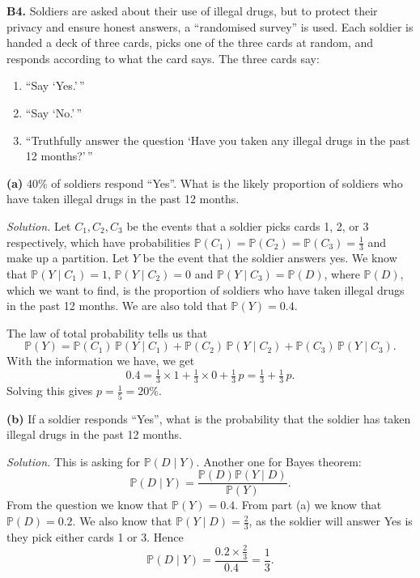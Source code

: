 \documentclass[
  a4paper,
]{book}
\providecommand{\tightlist}{%
  \setlength{\itemsep}{0pt}\setlength{\parskip}{0pt}}
\theoremstyle{definition}
\theoremstyle{definition}
\theoremstyle{definition}
\theoremstyle{definition}
\theoremstyle{remark}
\begin{document}
\textbf{B4.} Soldiers are asked about their use of illegal drugs, but to protect their privacy and ensure honest answers, a ``randomised survey'' is used. Each soldier is handed a deck of three cards, picks one of the three cards at random, and responds according to what the card says. The three cards say:

\begin{enumerate}
\def\labelenumi{\arabic{enumi}.}
\tightlist
\item
  ``Say `Yes.'\,''
\item
  ``Say `No.'\,''
\item
  ``Truthfully answer the question `Have you taken any illegal drugs in the past 12 months?'\,''
\end{enumerate}

\textbf{(a)} 40\% of soldiers respond ``Yes''. What is the likely proportion of soldiers who have taken illegal drugs in the past 12 months.

\begin{myanswers}
\emph{Solution.}
Let \(C_1, C_2, C_3\) be the events that a soldier picks cards 1, 2, or 3 respectively, which have probabilities \(\mathbb P(C_1) = \mathbb P(C_2) = \mathbb P(C_3) = \frac13\) and make up a partition. Let \(Y\) be the event that the soldier answers yes. We know that \(\mathbb P(Y \mid C_1) = 1\), \(\mathbb P(Y \mid C_2) = 0\) and \(\mathbb P(Y \mid C_3) = \mathbb P(D)\), where \(\mathbb P(D)\), which we want to find, is the proportion of soldiers who have taken illegal drugs in the past 12 months. We are also told that \(\mathbb P(Y) = 0.4\).

The law of total probability tells us that
\[ \mathbb P(Y) = \mathbb P(C_1)\,\mathbb P(Y \mid C_1) + \mathbb P(C_2)\,\mathbb P(Y \mid C_2) + 
\mathbb P(C_3)\,\mathbb P(Y \mid C_3) .\]
With the information we have, we get
\[ 0.4 = \tfrac13 \times 1 + \tfrac13 \times 0 + \tfrac13 \, p = \tfrac13 + \tfrac13 \,p . \]
Solving this gives \(p = \frac15 = 20\%\).

\end{myanswers}

\textbf{(b)} If a soldier responds ``Yes'', what is the probability that the soldier has taken illegal drugs in the past 12 months.

\begin{myanswers}
\emph{Solution.}
This is asking for \(\mathbb P(D \mid Y)\). Another one for Bayes theorem:
\[ \mathbb P(D \mid Y) = \frac{\mathbb P(D) \mathbb P(Y \mid D)}{\mathbb P(Y)} . \]
From the question we know that \(\mathbb P(Y) = 0.4\). From part (a) we know that \(\mathbb P(D) = 0.2\). We also know that \(\mathbb P(Y \mid D) = \frac23\), as the soldier will answer Yes is they pick either cards 1 or 3. Hence
\[ \mathbb P(D \mid Y) = \frac{0.2 \times \frac23}{0.4} = \frac13 . \]

\end{myanswers}
\end{document}
